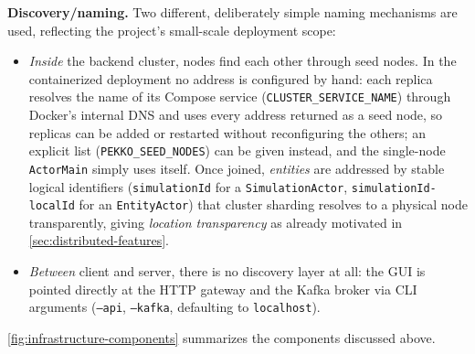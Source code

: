 \documentclass{scrreprt}
\begin{document}
\textbf{Discovery/naming.} Two different, deliberately simple naming mechanisms are used,
reflecting the project's small-scale deployment scope:
\begin{itemize}
  \item \emph{Inside} the backend cluster, nodes find each other through seed nodes. In the
  containerized deployment no address is configured by hand: each replica resolves the name of
  its Compose service (\texttt{CLUSTER\_SERVICE\_NAME}) through Docker's internal DNS and uses
  every address returned as a seed node, so replicas can be added or restarted without
  reconfiguring the others; an explicit list (\texttt{PEKKO\_SEED\_NODES}) can be given
  instead, and the single-node \texttt{ActorMain} simply uses itself. Once joined, \emph{entities} are
  addressed by stable logical identifiers (\texttt{simulationId} for a
  \texttt{SimulationActor}, \texttt{simulationId-localId} for an \texttt{EntityActor}) that
  cluster sharding resolves to a physical node transparently, giving \emph{location
  transparency} as already motivated in \cref{sec:distributed-features}.
  \item \emph{Between} client and server, there is no discovery layer at all: the GUI is
  pointed directly at the HTTP gateway and the Kafka broker via CLI arguments
  (\texttt{--api}, \texttt{--kafka}, defaulting to \texttt{localhost}).
\end{itemize}

\cref{fig:infrastructure-components} summarizes the components discussed above.
\end{document}
